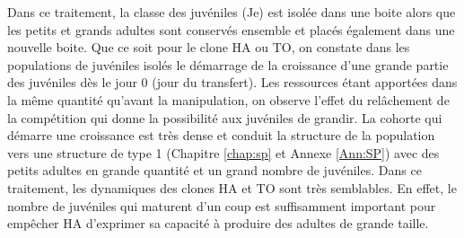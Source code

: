 Dans ce traitement, la classe des juvéniles (Je) est isolée dans une boite alors
que les petits et grands adultes sont conservés ensemble et placés également
dans une nouvelle boite. Que ce soit pour le clone HA ou TO, on constate dans
les populations de juvéniles isolés le démarrage de la croissance d'une grande
partie des juvéniles dès le jour 0 (jour du transfert). Les ressources étant
apportées dans la même quantité qu'avant la manipulation, on observe l'effet du
relâchement de la compétition qui donne la possibilité aux juvéniles de grandir.
La cohorte qui démarre une croissance est très dense et conduit la structure de
la population vers une structure de type 1 (Chapitre \ref{chap:sp} et Annexe
\ref{Ann:SP}) avec des petits adultes en grande quantité et un grand nombre de
juvéniles. Dans ce traitement, les dynamiques des clones HA et TO sont très
semblables. En effet, le nombre de juvéniles qui maturent d'un coup est
suffisamment important pour empêcher HA d'exprimer sa capacité à produire des
adultes de grande taille.

